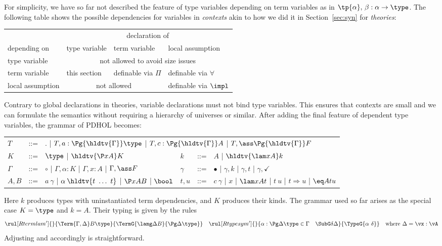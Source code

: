 For simplicity, we have so far not described the feature of type variables depending on term variables as in $\tp{\alpha},\,\beta:\alpha\to\type$.
The following table shows the possible dependencies for variables in \emph{contexts} akin to how we did it in Section~\ref{sec:syn} for \emph{theories}:
\begin{center}
\begin{tabular}{|l|l|l|l|}
\hline
 & \multicolumn{3}{c|}{declaration of} \\
depending on & type variable & term variable & local assumption \\
\hline
type variable & \multicolumn{3}{c|}{not allowed to avoid size issues} \\
term variable & this section & definable via $\Pi$ & definable via $\forall$ \\
local assumption&  \multicolumn{2}{c|}{not allowed} & definable via $\impl$\\
\hline
\end{tabular}
\end{center}
Contrary to global declarations in theories, variable declarations must not bind type variables.
This ensures that contexts are small and we can formulate the semantics without requiring a hierarchy of universes or similar.
After adding the final feature of dependent type variables, the grammar of PDHOL becomes:
\begin{center}
\begin{tabular}{|l c l | l c l|}
  \hline
  \(T\) & ::= & \multicolumn{4}{l|}{\(.\) | $T, a:\Pg{\hldtv{\Gamma}}\type$ | $T, c: \Pg{\hldtv{\Gamma}} A$ | $T, \ass\Pg{\hldtv{\Gamma}} F$}\\
  $K$   & ::= & $\type$ | $\hldtv{\P xA} K$ & $k$ & ::= & $A$ | $\hldtv{\lam xA} k$ \\

  \(\Gamma\) & ::= & \(\circ\) | $\Gamma, \alpha:K$ | $\Gamma, x: A$ | $\Gamma,\ass F$ & \(\gamma\) & ::= & \(\bullet\) | $\gamma, k$ | $\gamma, t$ | $\gamma,\checkmark$ \\
  \(A,B\) & ::= & $a\:\gamma$ | $\alpha\:\hldtv{t\ \ldots\ t}$ | $\P xAB$ | $\bool$ & \(t,u\) &
                                                                                                ::= & $c\:\gamma$ | \(x\) | $\lam xAt$ | $t\:u$ | $t\Rightarrow u$ | $\eq Atu$ \\
  \hline
\end{tabular}
\end{center}
Here $k$ produces types with uninstantiated term dependencies, and $K$ produces their kinds.
The grammar used so far arises as the special case $K=\type$ and $k=A$.
Their typing is given by the rules
\[\rul[Rtermlam']{}{\Term{\Gamma,\Delta}B\type}{\TermG{\lamg\Delta B}{\Pg\Delta\type}} \quad
\rul[Rtypesym']{}{\alpha:\Pg\Delta\type\in \Gamma \quad \SubG \delta\Delta}{\TypeG{\alpha\ \delta}} \quad \text{where } \Delta=\vx:\vA\]
Adjusting \Rctxtype and \Rsubtype accordingly is straightforward.

